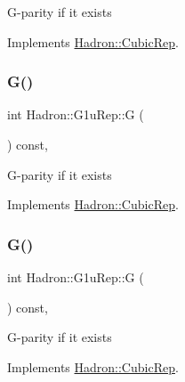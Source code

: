 G-\/parity if it exists 

Implements \mbox{\hyperlink{structHadron_1_1CubicRep_a52104e43266d1614c00bbd1c3b395458}{Hadron\+::\+Cubic\+Rep}}.

\mbox{\label{structHadron_1_1G1uRep_a458d6b9eaf24491739d751fb9227a27e}} 
\subsubsection{\texorpdfstring{G()}{G()}\hspace{0.1cm}{\footnotesize\ttfamily [2/3]}}
{\footnotesize\ttfamily int Hadron\+::\+G1u\+Rep\+::G (\begin{DoxyParamCaption}{ }\end{DoxyParamCaption}) const\hspace{0.3cm}{\ttfamily [inline]}, {\ttfamily [virtual]}}

G-\/parity if it exists 

Implements \mbox{\hyperlink{structHadron_1_1CubicRep_a52104e43266d1614c00bbd1c3b395458}{Hadron\+::\+Cubic\+Rep}}.

\mbox{\label{structHadron_1_1G1uRep_a458d6b9eaf24491739d751fb9227a27e}} 
\subsubsection{\texorpdfstring{G()}{G()}\hspace{0.1cm}{\footnotesize\ttfamily [3/3]}}
{\footnotesize\ttfamily int Hadron\+::\+G1u\+Rep\+::G (\begin{DoxyParamCaption}{ }\end{DoxyParamCaption}) const\hspace{0.3cm}{\ttfamily [inline]}, {\ttfamily [virtual]}}

G-\/parity if it exists 

Implements \mbox{\hyperlink{structHadron_1_1CubicRep_a52104e43266d1614c00bbd1c3b395458}{Hadron\+::\+Cubic\+Rep}}.

\mbox{\label{structHadron_1_1G1uRep_a8d180c78f98256ab0c502e87e2495295}} 
